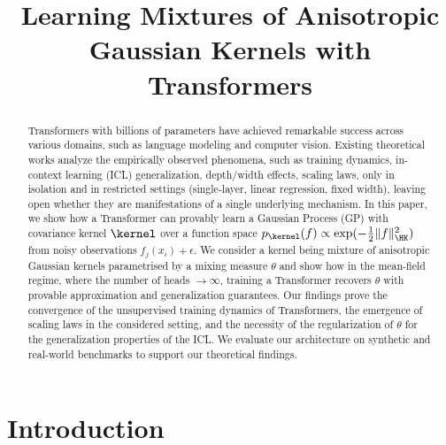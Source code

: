 \documentclass{article}
\title{Learning Mixtures of Anisotropic Gaussian Kernels with Transformers}
\author{}
\begin{document}
\maketitle


\section{Introduction}


\begin{abstract}
	Transformers with billions of parameters have achieved remarkable success across various domains, such as language modeling and computer vision.
	Existing theoretical works analyze the empirically observed phenomena, such as training dynamics, in-context learning (ICL) generalization, depth/width effects, scaling laws, only in isolation and in restricted settings (single-layer, linear regression, fixed width), leaving open whether they are manifestations of a single underlying mechanism.
	In this paper, we show how a Transformer can provably learn a Gaussian Process (GP) with covariance kernel $\kernel$ over a function space $p_\kernel(f) \propto \exp(-\frac{1}{2}\|f\|_{\HK}^2)$ from noisy observations $f_j(x_i) + \epsilon$.
	We consider a kernel being mixture of anisotropic Gaussian kernels parametrised by a mixing measure $\theta$ and show how in the mean-field regime, where the number of heads $\to \infty$, training a Transformer recovers $\theta$ with provable approximation and generalization guarantees.
	Our findings prove the convergence of the unsupervised training dynamics of Transformers, the emergence of scaling laws in the considered setting, and the necessity of the regularization of $\theta$ for the generalization properties of the ICL.
	We evaluate our architecture on synthetic and real-world benchmarks to support our theoretical findings.
\end{abstract}

\end{document}
